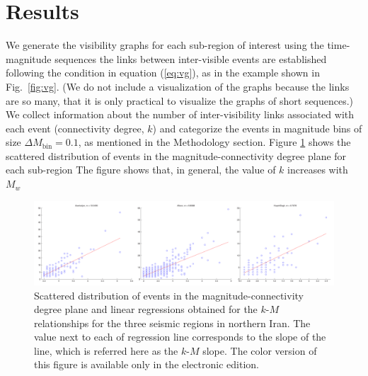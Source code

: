 
\section{Results}

We generate the visibility graphs for each sub-region of interest using the time-magnitude sequences  the links between inter-visible events are established following the condition in equation (\ref{eq:vg}), as in the example shown in Fig.~\ref{fig:vg}. (We do not include a visualization of the graphs because the links are so many, that it is only practical to visualize the graphs of short sequences.) We collect information about the number of inter-visibility links associated with each event (connectivity degree, $k$) and categorize the events in magnitude bins of size $\Delta M_{\mathrm{bin}} = 0.1$, as mentioned in the Methodology section. Figure \ref{fig:km} shows the scattered distribution of events in the magnitude-connectivity degree plane for each sub-region The figure shows that, in general, the value of $k$ increases with $M_w$

\begin{figure}[t]
	\centering
	\includegraphics[width=\textwidth]{figures/pdf/figure-06-rev.pdf} 
	\caption{Scattered distribution of events in the magnitude-connectivity degree plane and linear regressions obtained for the $k$-$M$ relationships for the three seismic regions in northern Iran. The value next to each of regression line corresponds to the slope of the line, which is referred here as the $k$-$M$ slope. The color version of this figure is available only in the electronic edition.}
	\label{fig:km}
\end{figure}

